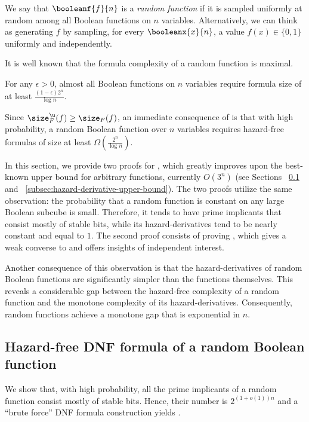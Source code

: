 \documentclass[acmsmall, nonacm, authorversion]{acmart}
\begin{document}
\begin{definition}\label{def:random-boolean-function}
We say that $\booleanf{f}{n}$ is a \emph{random function} if it is sampled uniformly at random among all Boolean functions on $n$ variables. Alternatively, we can think as generating $f$ by sampling, for every $\booleanx{x}{n}$, a value $f(x)\in \{0,1\}$ uniformly and independently.
\end{definition}

It is well known that the formula complexity of a random function is maximal. 
\begin{theorem}\label{thm:almost-all-formulas-are-large}
For any $\epsilon>0$, almost all Boolean functions on $n$ variables require formula size of at least $\frac{(1-\epsilon)2^n}{\log n}$.
\end{theorem}
Since $\size_F^\u(f)\ge \size_F(f)$, an immediate consequence of  is that with high probability, a random Boolean function over $n$ variables requires hazard-free formulas of size at least $\Omega(\frac{2^n}{\log n})$.

In this section, we provide two proofs for , which greatly improves upon the best-known upper bound for arbitrary functions, currently $O(3^n)$ (see Sections ~\ref{subsec:random-function-dnf} and ~\ref{subsec:hazard-derivative-upper-bound}). The two proofs utilize the same observation: the probability that a random function is constant on any large Boolean subcube is small. Therefore, it tends to have prime implicants that consist mostly of stable bits, while its hazard-derivatives tend to be nearly constant and equal to $1$. The second proof consists of proving , which gives a weak converse to  and offers insights of independent interest.

Another consequence of this observation is that the hazard-derivatives of random Boolean functions are significantly simpler than the functions themselves. This reveals a considerable gap between the hazard-free complexity of a random function and the monotone complexity of its hazard-derivatives. Consequently, random functions achieve a monotone gap that is exponential in $n$.

\subsection{Hazard-free DNF formula of a random Boolean function}\label{subsec:random-function-dnf}
We show that, with high probability, all the prime implicants of a random function consist mostly of stable bits. Hence, their number is $2^{(1+o(1))n}$ and a ``brute force'' DNF formula construction yields . 
\end{document}
